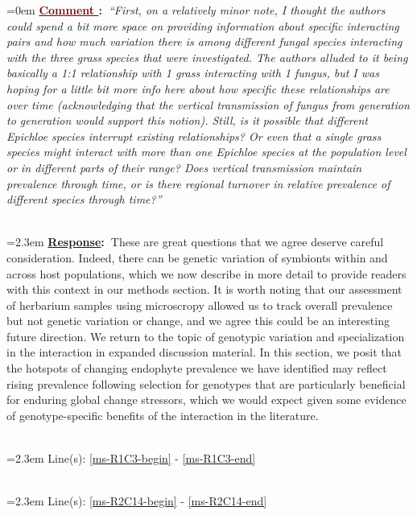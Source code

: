 \documentclass[12pt]{article}
\newcounter{cN}
\newcommand{\comment}[1]{
	\vspace{2em}
	\refstepcounter{cN} %
	\noindent \hangindent=0em \textbf{\textcolor{Maroon}{\uline{Comment \thecN}:~}}\emph{``#1''}
	}
\newcommand{\response}[1]{
	\\[0.25em]
	\hangindent=2.3em \textbf{\textcolor{NavyBlue}{\uline{Response}:~}}#1
	}
\newcommand{\linesref}[2]{
		\\[0.25em]
	\hangindent=2.3em {\color{Mahogany} Line(s): \ref{#1} - \ref{#2}}
}
\begin{document}
 \comment{First, on a relatively minor note, I thought the authors could spend a bit more space on providing information about specific interacting pairs and how much variation there is among different fungal species interacting with the three grass species that were investigated. The authors alluded to it being basically a 1:1 relationship with 1 grass interacting with 1 fungus, but I was hoping for a little bit more info here about how specific these relationships are over time (acknowledging that the vertical transmission of fungus from generation to generation would support this notion). Still, is it possible that different Epichloe species interrupt existing relationships? Or even that a single grass species might interact with more than one Epichloe species at the population level or in different parts of their range? Does vertical transmission maintain prevalence through time, or is there regional turnover in relative prevalence of different species through time?}
\response{These are great questions that we agree deserve careful consideration. Indeed, there can be genetic variation of symbionts within and across host populations, which we now describe in more detail to provide readers with this context in our methods section. It is worth noting that our assessment of herbarium samples using microscropy allowed us to track overall prevalence but not genetic variation or change, and we agree this could be an interesting future direction. We return to the topic of genotypic variation and specialization in the interaction in expanded discussion material. In this section,  we posit that the hotspots of changing endophyte prevalence we have identified may reflect rising prevalence following selection for genotypes that are particularly beneficial for enduring global change stressors, which we would expect given some evidence of genotype-specific benefits of the interaction in the literature.}
\linesref{ms-R1C3-begin}{ms-R1C3-end}
\linesref{ms-R2C14-begin}{ms-R2C14-end}
\end{document}
